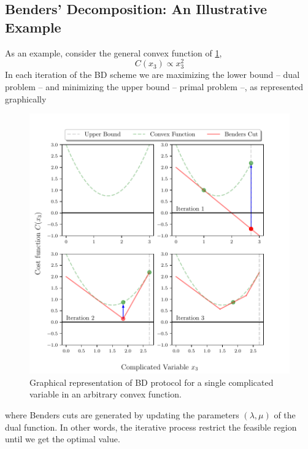 \subsection{Benders' Decomposition: An Illustrative Example}
As an example, consider the general convex function of \ref{fig:BDIlustration},
\begin{equation}
    C(x_{3}) \propto x_{3}^{2}
\end{equation}
In each iteration of the BD scheme we are maximizing the lower bound -- dual problem -- and minimizing the upper bound -- primal problem --, as represented graphically
\begin{figure}[H]
\centering
\includegraphics[width=\textwidth]{Figures/BenderIlustration.pdf} 
\caption{Graphical representation of BD protocol for a single complicated variable in an arbitrary convex function.}
\label{fig:BDIlustration}
\end{figure}
where Benders cuts are generated by updating the parameters $(\lambda,\mu)$ of the dual function. In other words, the iterative process restrict the feasible region until we get the optimal value.
